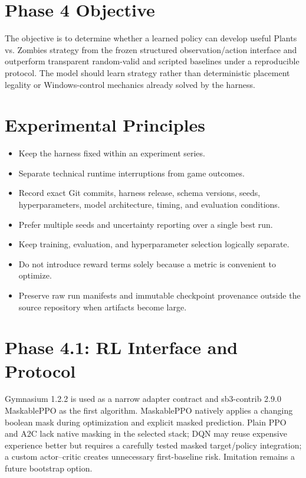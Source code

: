 \documentclass[11pt,a4paper]{article}
\begin{document}
\section{Phase 4 Objective}
The objective is to determine whether a learned policy can develop useful Plants vs. Zombies strategy from the frozen structured observation/action interface and outperform transparent random-valid and scripted baselines under a reproducible protocol. The model should learn strategy rather than deterministic placement legality or Windows-control mechanics already solved by the harness.

\section{Experimental Principles}
\begin{itemize}
\item Keep the harness fixed within an experiment series.
\item Separate technical runtime interruptions from game outcomes.
\item Record exact Git commits, harness release, schema versions, seeds, hyperparameters, model architecture, timing, and evaluation conditions.
\item Prefer multiple seeds and uncertainty reporting over a single best run.
\item Keep training, evaluation, and hyperparameter selection logically separate.
\item Do not introduce reward terms solely because a metric is convenient to optimize.
\item Preserve raw run manifests and immutable checkpoint provenance outside the source repository when artifacts become large.
\end{itemize}

\section{Phase 4.1: RL Interface and Protocol}
Gymnasium 1.2.2 is used as a narrow adapter contract and sb3-contrib 2.9.0 MaskablePPO as the first algorithm. MaskablePPO natively applies a changing boolean mask during optimization and explicit masked prediction. Plain PPO and A2C lack native masking in the selected stack; DQN may reuse expensive experience better but requires a carefully tested masked target/policy integration; a custom actor--critic creates unnecessary first-baseline risk. Imitation remains a future bootstrap option.
\end{document}
